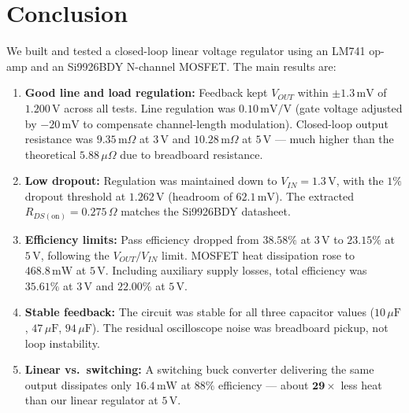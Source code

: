\documentclass[11pt,a4paper]{article}
\begin{document}
\section{Conclusion}
We built and tested a closed-loop linear voltage regulator using an LM741 op-amp and an Si9926BDY N-channel MOSFET. The main results are:
\begin{enumerate}[leftmargin=1.5em, itemsep=0.2em]
    \item \textbf{Good line and load regulation:} Feedback kept $V_{OUT}$ within $\pm 1.3\,\text{mV}$ of $1.200\,\text{V}$ across all tests. Line regulation was $0.10\,\text{mV/V}$ (gate voltage adjusted by $-20\,\text{mV}$ to compensate channel-length modulation). Closed-loop output resistance was $9.35\,\text{m}\Omega$ at $3\,\text{V}$ and $10.28\,\text{m}\Omega$ at $5\,\text{V}$ --- much higher than the theoretical $5.88\,\mu\Omega$ due to breadboard resistance.
    \item \textbf{Low dropout:} Regulation was maintained down to $V_{IN} = 1.3\,\text{V}$, with the $1\%$ dropout threshold at $1.262\,\text{V}$ (headroom of $62.1\,\text{mV}$). The extracted $R_{DS(\text{on})} = 0.275\,\Omega$ matches the Si9926BDY datasheet.
    \item \textbf{Efficiency limits:} Pass efficiency dropped from $38.58\%$ at $3\,\text{V}$ to $23.15\%$ at $5\,\text{V}$, following the $V_{OUT}/V_{IN}$ limit. MOSFET heat dissipation rose to $468.8\,\text{mW}$ at $5\,\text{V}$. Including auxiliary supply losses, total efficiency was $35.61\%$ at $3\,\text{V}$ and $22.00\%$ at $5\,\text{V}$.
    \item \textbf{Stable feedback:} The circuit was stable for all three capacitor values ($10\,\mu\text{F}$, $47\,\mu\text{F}$, $94\,\mu\text{F}$). The residual oscilloscope noise was breadboard pickup, not loop instability.
    \item \textbf{Linear vs.\ switching:} A switching buck converter delivering the same output dissipates only $16.4\,\text{mW}$ at $88\%$ efficiency --- about $\mathbf{29\times}$ less heat than our linear regulator at $5\,\text{V}$.
\end{enumerate}
\end{document}
